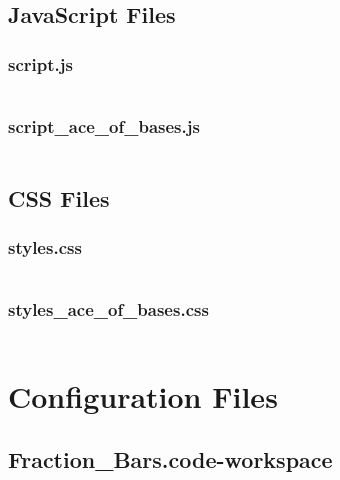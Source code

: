 \documentclass{article}
\begin{document}
\subsection{JavaScript Files}
\subsubsection{script.js}
\inputminted{javascript}{AceofBases/script.js}

\subsubsection{script\_ace\_of\_bases.js}
\inputminted{javascript}{AceofBases/script_ace_of_bases.js}

\subsection{CSS Files}
\subsubsection{styles.css}
\inputminted{css}{AceofBases/styles.css}

\subsubsection{styles\_ace\_of\_bases.css}
\inputminted{css}{AceofBases/styles_ace_of_bases.css}

\section{Configuration Files}
\subsection{Fraction\_Bars.code-workspace}
\inputminted{json}{Fraction_Bars.code-workspace}

\end{document}
